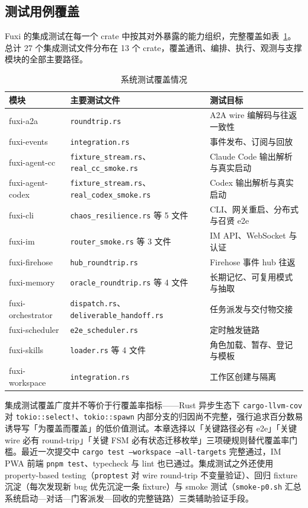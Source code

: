 \subsection{测试用例覆盖}

Fuxi 的集成测试在每一个 crate 中按其对外暴露的能力组织，完整覆盖如表~\ref{tab:test-coverage}。总计 27 个集成测试文件分布在 13 个 crate，覆盖通讯、编排、执行、观测与支撑模块的全部主要路径。

\begin{table}[H]
\centering
\caption{系统测试覆盖情况}
\label{tab:test-coverage}
\footnotesize
\begin{tabularx}{\textwidth}{p{2.7cm} p{6.0cm} X}
\toprule
模块 & 主要测试文件 & 测试目标 \\
\midrule
fuxi-a2a & \texttt{roundtrip.rs} & A2A wire 编解码与往返一致性 \\
fuxi-events & \texttt{integration.rs} & 事件发布、订阅与回放 \\
fuxi-agent-cc & \texttt{fixture\_stream.rs}、\texttt{real\_cc\_smoke.rs} & Claude Code 输出解析与真实启动 \\
fuxi-agent-codex & \texttt{fixture\_stream.rs}、\texttt{real\_codex\_smoke.rs} & Codex 输出解析与真实启动 \\
fuxi-cli & \texttt{chaos\_resilience.rs} 等 5 文件 & CLI、网关重启、分布式与召贤 e2e \\
fuxi-im & \texttt{router\_smoke.rs} 等 3 文件 & IM API、WebSocket 与认证 \\
fuxi-firehose & \texttt{hub\_roundtrip.rs} & Firehose 事件 hub 往返 \\
fuxi-memory & \texttt{oracle\_roundtrip.rs} 等 4 文件 & 长期记忆、可复用模式与抽取 \\
fuxi-orchestrator & \texttt{dispatch.rs}、\texttt{deliverable\_handoff.rs} & 任务派发与交付物交接 \\
fuxi-scheduler & \texttt{e2e\_scheduler.rs} & 定时触发链路 \\
fuxi-skills & \texttt{loader.rs} 等 4 文件 & 角色加载、暂存、登记与模板 \\
fuxi-workspace & \texttt{integration.rs} & 工作区创建与隔离 \\
\bottomrule
\end{tabularx}
\end{table}

集成测试覆盖广度并不等价于行覆盖率指标——Rust 异步生态下 \texttt{cargo-llvm-cov} 对 \texttt{tokio::select!}、\texttt{tokio::spawn} 内部分支的归因尚不完整，强行追求百分数易诱导写「为覆盖而覆盖」的低价值测试。本章选择以「关键路径必有 e2e」「关键 wire 必有 round-trip」「关键 FSM 必有状态迁移枚举」三项硬规则替代覆盖率门槛。最近一次提交中 \texttt{cargo test --workspace --all-targets} 完整通过，IM PWA 前端 \texttt{pnpm test}、typecheck 与 lint 也已通过。集成测试之外还使用 property-based testing（\texttt{proptest} 对 wire round-trip 不变量验证）、回归 fixture 沉淀（每次发现新 bug 优先沉淀一条 fixture）与 smoke 测试（\texttt{smoke-p0.sh} 汇总系统启动—对话—门客派发—回收的完整链路）三类辅助验证手段。

